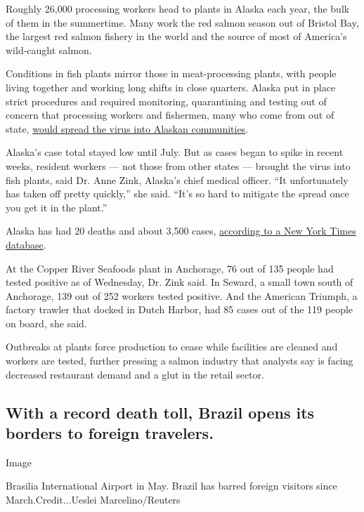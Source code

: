 Roughly 26,000 processing workers head to plants in Alaska each year,
the bulk of them in the summertime. Many work the red salmon season out
of Bristol Bay, the largest red salmon fishery in the world and the
source of most of America's wild-caught salmon.

Conditions in fish plants mirror those in meat-processing plants, with
people living together and working long shifts in close quarters. Alaska
put in place strict procedures and required monitoring, quarantining and
testing out of concern that processing workers and fishermen, many who
come from out of state,
\href{https://www.nytimes.com/2020/05/14/us/coronavirus-alaska-fishing-copper-river.html}{would
spread the virus into Alaskan communities}.

Alaska's case total stayed low until July. But as cases began to spike
in recent weeks, resident workers --- not those from other states ---
brought the virus into fish plants, said Dr. Anne Zink, Alaska's chief
medical officer. ``It unfortunately has taken off pretty quickly,'' she
said. ``It's so hard to mitigate the spread once you get it in the
plant.''

Alaska has had 20 deaths and about 3,500 cases,
\href{https://www.nytimes.com/interactive/2020/us/alaska-coronavirus-cases.html}{according
to a New York Times database}.

At the Copper River Seafoods plant in Anchorage, 76 out of 135 people
had tested positive as of Wednesday, Dr. Zink said. In Seward, a small
town south of Anchorage, 139 out of 252 workers tested positive. And the
American Triumph, a factory trawler that docked in Dutch Harbor, had 85
cases out of the 119 people on board, she said.

Outbreaks at plants force production to cease while facilities are
cleaned and workers are tested, further pressing a salmon industry that
analysts say is facing decreased restaurant demand and a glut in the
retail sector.

\hypertarget{with-a-record-death-toll-brazil-opens-its-borders-to-foreign-travelers}{%
\subsection{With a record death toll, Brazil opens its borders to
foreign
travelers.}\label{with-a-record-death-toll-brazil-opens-its-borders-to-foreign-travelers}}

Image

Brasilia International Airport in May. Brazil has barred foreign
visitors since March.Credit...Ueslei Marcelino/Reuters

